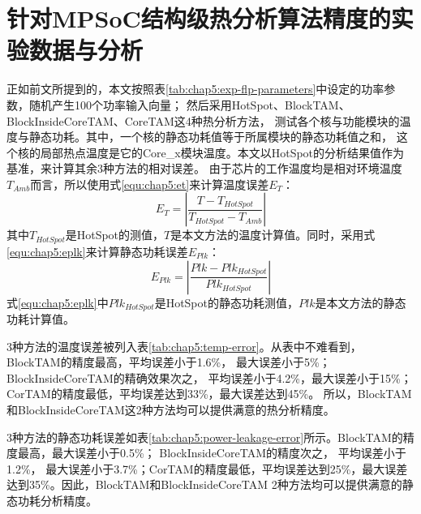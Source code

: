\section{针对MPSoC结构级热分析算法精度的实验数据与分析}
正如前文所提到的，本文按照表\ref{tab:chap5:exp-flp-parameters}中设定的功率参数，随机产生100个功率输入向量； 然后采用HotSpot、BlockTAM、BlockInsideCoreTAM、CoreTAM这4种热分析方法， 测试各个核与功能模块的温度与静态功耗。其中，一个核的静态功耗值等于所属模块的静态功耗值之和， 这个核的局部热点温度是它的Core\_x模块温度。本文以HotSpot的分析结果值作为基准，来计算其余3种方法的相对误差。 由于芯片的工作温度均是相对环境温度$T_{Amb}$而言，所以使用式\ref{equ:chap5:et}来计算温度误差$E_T$：
\begin{equation}
\label{equ:chap5:et}
E_T = |\frac{T-T_{HotSpot}}{T_{HotSpot}-T_{Amb}}|
\end{equation}
其中$T_{HotSpot}$是HotSpot的测值，$T$是本文方法的温度计算值。同时，采用式\ref{equ:chap5:eplk}来计算静态功耗误差$E_{Plk}$：
\begin{equation}
\label{equ:chap5:eplk}
E_{Plk} = |\frac{Plk-Plk_{HotSpot}}{Plk_{HotSpot}}|
\end{equation}
式\ref{equ:chap5:eplk}中$Plk_{HotSpot}$是HotSpot的静态功耗测值，$Plk$是本文方法的静态功耗计算值。

3种方法的温度误差被列入表\ref{tab:chap5:temp-error}。从表中不难看到，BlockTAM的精度最高，平均误差小于1.6\%， 最大误差小于5\%；BlockInsideCoreTAM的精确效果次之， 平均误差小于4.2\%，最大误差小于15\%；CorTAM的精度最低，平均误差达到33\%，最大误差达到45\%。 所以，BlockTAM和BlockInsideCoreTAM这2种方法均可以提供满意的热分析精度。

3种方法的静态功耗误差如表\ref{tab:chap5:power-leakage-error}所示。BlockTAM的精度最高，最大误差小于0.5\%； BlockInsideCoreTAM的精度次之， 平均误差小于1.2\%， 最大误差小于3.7\%；CorTAM的精度最低，平均误差达到25\%，最大误差达到35\%。因此，BlockTAM和BlockInsideCoreTAM 2种方法均可以提供满意的静态功耗分析精度。

